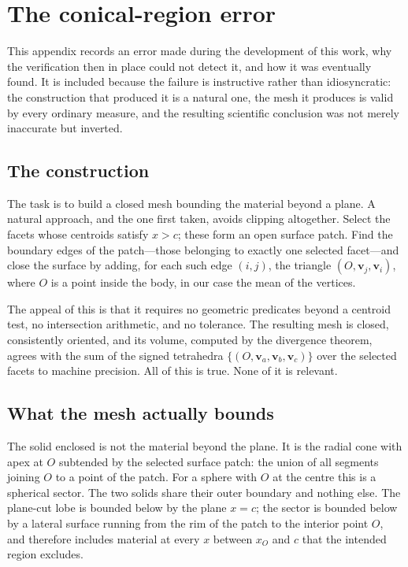 \section{The conical-region error}
\label{app:cone}

This appendix records an error made during the development of this work, why
the verification then in place could not detect it, and how it was eventually
found. It is included because the failure is instructive rather than
idiosyncratic: the construction that produced it is a natural one, the mesh it
produces is valid by every ordinary measure, and the resulting scientific
conclusion was not merely inaccurate but inverted.

\subsection{The construction}
\label{app:cone:construction}

The task is to build a closed mesh bounding the material beyond a plane. A
natural approach, and the one first taken, avoids clipping altogether. Select
the facets whose centroids satisfy $x > c$; these form an open surface patch.
Find the boundary edges of the patch---those belonging to exactly one selected
facet---and close the surface by adding, for each such edge $(i,j)$, the
triangle $(O, \mathbf{v}_j, \mathbf{v}_i)$, where $O$ is a point inside the
body, in our case the mean of the vertices.

The appeal of this is that it requires no geometric predicates beyond a
centroid test, no intersection arithmetic, and no tolerance. The resulting mesh
is closed, consistently oriented, and its volume, computed by the divergence
theorem, agrees with the sum of the signed tetrahedra
$\{(O, \mathbf{v}_a, \mathbf{v}_b, \mathbf{v}_c)\}$ over the selected facets to
machine precision. All of this is true. None of it is relevant.

\subsection{What the mesh actually bounds}
\label{app:cone:solid}

The solid enclosed is not the material beyond the plane. It is the radial cone
with apex at $O$ subtended by the selected surface patch: the union of all
segments joining $O$ to a point of the patch. For a sphere with $O$ at the
centre this is a spherical sector. The two solids share their outer boundary
and nothing else. The plane-cut lobe is bounded below by the plane $x = c$; the
sector is bounded below by a lateral surface running from the rim of the patch
to the interior point $O$, and therefore includes material at every $x$ between
$x_O$ and $c$ that the intended region excludes.

